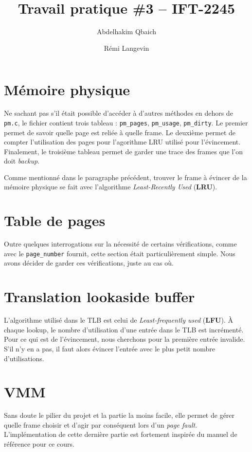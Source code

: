 \documentclass{article}
\title{Travail pratique \#3 -- IFT-2245}
\author{Abdelhakim Qbaich \and Rémi Langevin}
\begin{document}
\maketitle

\section{Mémoire physique}

Ne sachant pas s'il était possible d'accéder à d'autres méthodes en dehors de \texttt{pm.c}, le fichier contient trois tableau : \texttt{pm\_pages}, \texttt{pm\_usage}, \texttt{pm\_dirty}. Le premier permet de savoir quelle page est reliée à quelle frame. Le deuxième permet de compter l'utilisation des pages pour l'agorithme LRU utilisé pour l'évincement. Finalement, le troisième tableau permet de garder une trace des frames que l'on doit \textit{backup}.

Comme mentionné dans le paragraphe précédent, trouver le frame à évincer de la mémoire physique se fait avec l'algorithme \textit{Least-Recently Used} (\textbf{LRU}).

\section{Table de pages}

Outre quelques interrogations sur la nécessité de certains vérifications, comme avec le \texttt{page\_number} fournit, cette section était particulièrement simple. Nous avons décider de garder ces vérifications, juste au cas où.

\section{Translation lookaside buffer}

L'algorithme utilisé dans le TLB est celui de \textit{Least-frequently used} (\textbf{LFU}).
À chaque lookup, le nombre d'utilisation d'une entrée dans le TLB est incrémenté. Pour ce qui est de l'évincement, nous cherchons pour la première entrée invalide. S'il n'y en a pas, il faut alors évincer l'entrée avec le plus petit nombre d'utilisations.

\section{VMM}

Sans doute le pilier du projet et la partie la moins facile, elle permet de gérer quelle frame choisir et d'agir par conséquent lors d'un \textit{page fault}. L'implémentation de cette dernière partie est fortement inspirée du manuel de référence pour ce cours.


\end{document}
